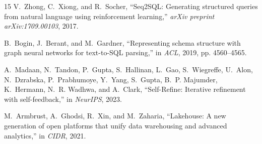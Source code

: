 \documentclass[10pt,journal,compsoc]{IEEEtran}
\begin{document}
\begin{thebibliography}{15}
V.~Zhong, C.~Xiong, and R.~Socher, ``Seq2SQL: Generating structured queries from natural language using reinforcement learning,'' \emph{arXiv preprint arXiv:1709.00103}, 2017.

B.~Bogin, J.~Berant, and M.~Gardner, ``Representing schema structure with graph neural networks for text-to-SQL parsing,'' in \emph{ACL}, 2019, pp. 4560--4565.

A.~Madaan, N.~Tandon, P.~Gupta, S.~Hallinan, L.~Gao, S.~Wiegreffe, U.~Alon, N.~Dzrabska, P.~Prabhumoye, Y.~Yang, S.~Gupta, B.~P. Majumder, K.~Hermann, N.~R. Wadhwa, and A.~Clark, ``Self-Refine: Iterative refinement with self-feedback,'' in \emph{NeurIPS}, 2023.

M.~Armbrust, A.~Ghodsi, R.~Xin, and M.~Zaharia, ``Lakehouse: A new generation of open platforms that unify data warehousing and advanced analytics,'' in \emph{CIDR}, 2021.
\end{thebibliography}
\end{document}
